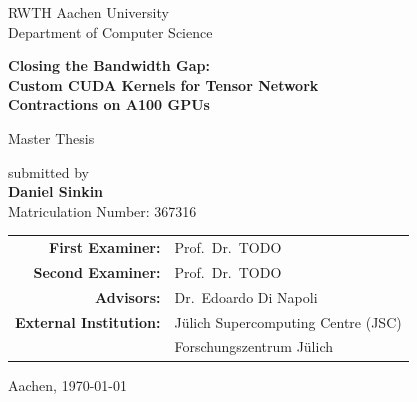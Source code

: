 \begin{titlepage}
  \centering

  \vspace*{1cm}

  {\large RWTH Aachen University\\
  Department of Computer Science}

  \vspace{1cm}


  \vspace{1.5cm}

  {\LARGE\bfseries
  Closing the Bandwidth Gap:\\
  Custom CUDA Kernels for Tensor Network\\
  Contractions on A100 GPUs}

  \vspace{1.5cm}

  {\Large Master Thesis}

  \vspace{1cm}

  {\large
  submitted by\\[0.5em]
  \textbf{Daniel Sinkin}\\
  Matriculation Number: 367316}

  \vfill

  \begin{tabular}{rl}
    \textbf{First Examiner:}  & Prof.\ Dr.\ TODO \\
    \textbf{Second Examiner:} & Prof.\ Dr.\ TODO \\
    \textbf{Advisors:}        & Dr.\ Edoardo Di Napoli \\
    \textbf{External Institution:} & Jülich Supercomputing Centre (JSC)\\
                                    & Forschungszentrum Jülich
  \end{tabular}

  \vspace{1cm}

  {\large Aachen, \today}

\end{titlepage}
